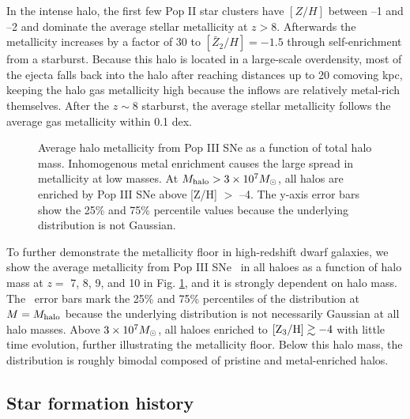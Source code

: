 \documentclass[apjl]{emulateapj}
\begin{document}
In the intense halo, the first few Pop II star clusters have $[Z/H]$
between --1 and --2 and dominate the average stellar metallicity at $z
> 8$.  Afterwards the metallicity increases by a factor of 30 to
$[\bar{Z}_2/H] = -1.5$ through self-enrichment from a starburst.
Because this halo is located in a large-scale overdensity, most of the
ejecta falls back into the halo after reaching distances up to 20
comoving kpc, keeping the halo gas metallicity high because the
inflows are relatively metal-rich themselves.  After the $z \sim 8$
starburst, the average stellar metallicity follows the average gas
metallicity within 0.1 dex.


\begin{figure}
\caption{\label{fig:z3} Average halo metallicity from Pop III SNe as a
  function of total halo mass.  Inhomogenous metal enrichment causes
  the large spread in metallicity at low masses.  At $M_{\rm halo} > 3
  \times 10^7 \Ms$, all halos are enriched by Pop III SNe above [Z/H]
  $>$ --4.  The y-axis error bars show the 25\% and 75\% percentile
  values because the underlying distribution is not Gaussian.}
\end{figure}


To further demonstrate the metallicity floor in high-redshift dwarf
galaxies, we show the average metallicity from Pop III SNe \zthree~in
all haloes as a function of halo mass at $z =$ 7, 8, 9, and 10 in
Fig. \ref{fig:z3}, and it is strongly dependent on halo mass.  The
\zthree~error bars mark the 25\% and 75\% percentiles of the
distribution at $M = M_{\rm halo}$ because the underlying distribution
is not necessarily Gaussian at all halo masses.  Above $3 \times 10^7
\Ms$, all haloes enriched to $\zthree \ga -4$ with little time
evolution, further illustrating the metallicity floor.  Below this
halo mass, the distribution is roughly bimodal composed of pristine
and metal-enriched halos.

\subsection{Star formation history}
\label{sec:pop}

\end{document}
